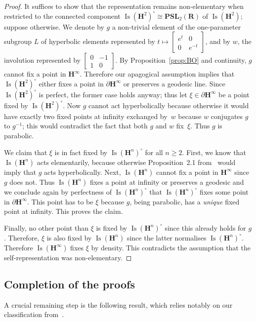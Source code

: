 \documentclass[11pt]{article}
\theoremstyle{definition}
\numberwithin{equation}{section}
\numberwithin{figure}{section}
\numberwithin{table}{section}
\newcommand{\RR}{\mathbf{R}}
\newcommand{\PSL}{\mathbf{PSL}}
\newcommand{\HH}{\mathbf{H}}
\newcommand{\HHI}{\mathbf{H}^{\infty}}
\newcommand{\Isomi}{{\Isom}(\HHI)}
\DeclareMathOperator{\Isom}{Is}
\newcommand{\inv}{^{-1}}
\begin{document}
\begin{proof}
It suffices to show that the representation remains non-elementary when restricted to the connected component $\Isom(\HH^2)^\circ\cong \PSL_2(\RR)$ of $\Isom(\HH^2)$; suppose otherwise. We denote by $g$ a non-trivial element of the one-parameter subgroup $L$ of hyperbolic elements represented by $t\mapsto \left[\begin{smallmatrix}e^t&0\\ 0&e^{-t}\end{smallmatrix}\right]$, and by $w$, the involution represented by $\left[\begin{smallmatrix}0&-1\\ 1&0\end{smallmatrix}\right]$. By Proposition~\ref{prop:BO} and continuity, $g$ cannot fix a point in $\HHI$. Therefore our apagogical assumption implies that $\Isom(\HH^2)^\circ$ either fixes a point in $\partial\HHI$ or preserves a geodesic line. Since $\Isom(\HH^2)^\circ$ is perfect, the former case holds anyway; thus let $\xi\in\partial\HHI$ be a point fixed by $\Isom(\HH^2)^\circ$. Now $g$ cannot act hyperbolically because otherwise it would have exactly two fixed points at infinity exchanged by~$w$ because $w$ conjugates $g$ to $g\inv
$; this would contradict the fact that both $g$ and $w$ fix~$\xi$. Thus $g$ is parabolic.

We claim that $\xi$ is in fact fixed by $\Isom(\HH^n)^\circ$ for all $n\geq 2$. First, we know that $\Isom(\HH^n)$ acts elementarily, because otherwise Proposition~2.1 from~\cite{Monod-Py} would imply that $g$ acts hyperbolically. Next, $\Isom(\HH^n)$ cannot fix a point in $\HHI$ since $g$ does not. Thus $\Isom(\HH^n)$ fixes a point at infinity or preserves a geodesic and we conclude again by perfectness of $\Isom(\HH^n)^\circ$ that $\Isom(\HH^n)^\circ$ fixes some point in $\partial\HHI$. This point has to be $\xi$ because $g$, being parabolic, has a \emph{unique} fixed point at infinity. This proves the claim.

Finally, no other point than $\xi$ is fixed by $\Isom(\HH^n)^\circ$ since this already holds for $g$. Therefore, $\xi$ is also fixed by $\Isom(\HH^n)$ since the latter normalises $\Isom(\HH^n)^\circ$. Therefore $\Isomi$ fixes $\xi$ by density. This contradicts the assumption that the self-representation was non-elementary.
\end{proof}

\subsection{Completion of the proofs} A crucial remaining step is the following result, which relies notably on our classification from~\cite{Monod-Py}.
\end{document}
